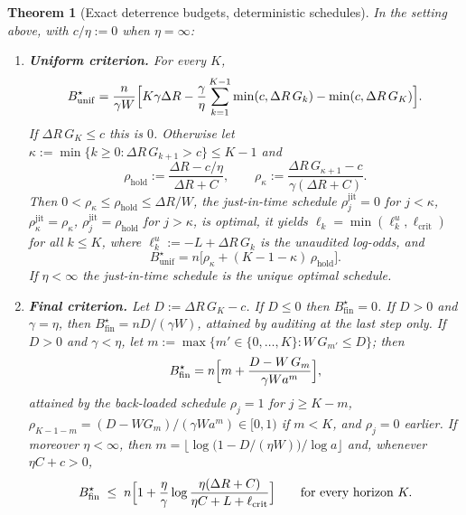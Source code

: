 \documentclass[11pt,a4paper]{article}
\newtheorem{theorem}{Theorem}
\begin{document}
\begin{theorem}[Exact deterrence budgets, deterministic schedules]
\label{thm:audit-deterrence}
In the setting above, with $c/\eta:=0$ when $\eta=\infty$:
\begin{enumerate}
\item[\textup{(i)}] \textbf{Uniform criterion.} For every $K$,
\begin{equation}\label{eq:audit-unif-id}
  B^\star_{\mathrm{unif}}=\frac{n}{\gamma W}\Bigl[K\gamma\Delta R
   -\frac{\gamma}{\eta}\sum_{k=1}^{K-1}\min(c,\Delta R\,G_k)-\min(c,\Delta R\,G_K)\Bigr].
\end{equation}
If $\Delta R\,G_K\le c$ this is $0$. Otherwise let
$\kappa:=\min\{k\ge0:\Delta R\,G_{k+1}>c\}\le K-1$ and
\[
  \rho_{\mathrm{hold}}:=\frac{\Delta R-c/\eta}{\Delta R+C},\qquad
  \rho_\kappa:=\frac{\Delta R\,G_{\kappa+1}-c}{\gamma(\Delta R+C)} .
\]
Then $0<\rho_\kappa\le\rho_{\mathrm{hold}}\le\Delta R/W$, the
\emph{just-in-time} schedule
$\rho^{\mathrm{jit}}_j=0$ for $j<\kappa$, $\rho^{\mathrm{jit}}_\kappa=\rho_\kappa$,
$\rho^{\mathrm{jit}}_j=\rho_{\mathrm{hold}}$ for $j>\kappa$, is optimal, it yields
$\ell_k=\min(\ell^{u}_k,\ell_{\mathrm{crit}})$ for all $k\le K$, where $\ell^{u}_k:=-L+\Delta R\,G_k$ is the unaudited log-odds, and
\begin{equation}\label{eq:audit-unif}
  B^\star_{\mathrm{unif}}=n\bigl[\rho_\kappa+(K-1-\kappa)\,\rho_{\mathrm{hold}}\bigr].
\end{equation}
If $\eta<\infty$ the just-in-time schedule is the unique optimal schedule.
\item[\textup{(ii)}] \textbf{Final criterion.} Let $D:=\Delta R\,G_K-c$. If
$D\le0$ then $B^\star_{\mathrm{fin}}=0$. If $D>0$ and $\gamma=\eta$, then
$B^\star_{\mathrm{fin}}=nD/(\gamma W)$, attained by auditing at the last step
only. If $D>0$ and $\gamma<\eta$, let
$m:=\max\{m'\in\{0,\dots,K\}: W\,G_{m'}\le D\}$; then
\begin{equation}\label{eq:audit-fin}
  B^\star_{\mathrm{fin}}=n\Bigl[m+\frac{D-W\,G_m}{\gamma W a^{m}}\Bigr],
\end{equation}
attained by the \emph{back-loaded} schedule $\rho_j=1$ for $j\ge K-m$,
$\rho_{K-1-m}=(D-WG_m)/(\gamma Wa^m)\in[0,1)$ if $m<K$, and $\rho_j=0$ earlier.
If moreover $\eta<\infty$, then
$m=\bigl\lfloor \log\bigl(1-D/(\eta W)\bigr)/\log a\bigr\rfloor$ and, whenever
$\eta C+c>0$,
\begin{equation}\label{eq:audit-fin-bound}
  B^\star_{\mathrm{fin}}\;\le\; n\Bigl[1+\frac{\eta}{\gamma}
  \log\frac{\eta(\Delta R+C)}{\eta C+L+\ell_{\mathrm{crit}}}\Bigr]
  \qquad\text{for every horizon }K .
\end{equation}
\end{enumerate}
\end{theorem}
\end{document}
